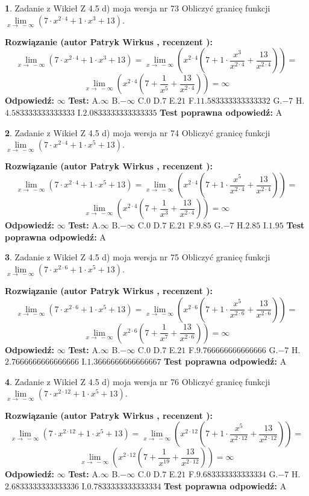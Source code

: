\documentclass[12pt, a4paper]{article}
\theoremstyle{definition} %
\newtheorem{zad}{}
\newcommand{\zadStart}[1]{\begin{zad}#1\newline}
\newcommand{\zadStop}{\end{zad}}
\newcommand{\rozwStart}[2]{\noindent \textbf{Rozwiązanie (autor #1 , recenzent #2): }\newline}
\newcommand{\rozwStop}{\newline}
\newcommand{\odpStart}{\noindent \textbf{Odpowiedź:}\newline}
\newcommand{\odpStop}{\newline}
\newcommand{\testStart}{\noindent \textbf{Test:}\newline}
\newcommand{\testStop}{\newline}
\newcommand{\kluczStart}{\noindent \textbf{Test poprawna odpowiedź:}\newline}
\newcommand{\kluczStop}{\newline}
\begin{document}
\zadStart{Zadanie z Wikieł Z 4.5 d) moja wersja nr 73}
Obliczyć granicę funkcji  $\lim\limits_{x\to\ -\infty}(7 \cdot x^{2\cdot4}+1 \cdot x^{3}+13)$.
\zadStop
\rozwStart{Patryk Wirkus}{}
$$\lim\limits_{x\to\ -\infty}(7 \cdot x^{2\cdot4}+1 \cdot x^{3}+13) = \lim\limits_{x\to\ -\infty}(x^{2\cdot4}(7 +1 \cdot \frac{x^{3}}{x^{2\cdot4}}+\frac{13}{x^{2\cdot4}})) =$$ $$\lim\limits_{x\to\ -\infty}(x^{2\cdot4}(7 +\frac{1}{x^{5}}+\frac{13}{x^{2\cdot4}})) =\infty$$
\rozwStop
\odpStart
$\infty$
\odpStop
\testStart
A.$\infty$ B.$-\infty$ C.$0$ D.$7$ E.$21$
F.$11.583333333333332$ G.$-7$
H.$4.583333333333333$
I.$2.0833333333333335$
\testStop
\kluczStart
A
\kluczStop



\zadStart{Zadanie z Wikieł Z 4.5 d) moja wersja nr 74}
Obliczyć granicę funkcji  $\lim\limits_{x\to\ -\infty}(7 \cdot x^{2\cdot4}+1 \cdot x^{5}+13)$.
\zadStop
\rozwStart{Patryk Wirkus}{}
$$\lim\limits_{x\to\ -\infty}(7 \cdot x^{2\cdot4}+1 \cdot x^{5}+13) = \lim\limits_{x\to\ -\infty}(x^{2\cdot4}(7 +1 \cdot \frac{x^{5}}{x^{2\cdot4}}+\frac{13}{x^{2\cdot4}})) =$$ $$\lim\limits_{x\to\ -\infty}(x^{2\cdot4}(7 +\frac{1}{x^{3}}+\frac{13}{x^{2\cdot4}})) =\infty$$
\rozwStop
\odpStart
$\infty$
\odpStop
\testStart
A.$\infty$ B.$-\infty$ C.$0$ D.$7$ E.$21$
F.$9.85$ G.$-7$
H.$2.85$
I.$1.95$
\testStop
\kluczStart
A
\kluczStop



\zadStart{Zadanie z Wikieł Z 4.5 d) moja wersja nr 75}
Obliczyć granicę funkcji  $\lim\limits_{x\to\ -\infty}(7 \cdot x^{2\cdot6}+1 \cdot x^{5}+13)$.
\zadStop
\rozwStart{Patryk Wirkus}{}
$$\lim\limits_{x\to\ -\infty}(7 \cdot x^{2\cdot6}+1 \cdot x^{5}+13) = \lim\limits_{x\to\ -\infty}(x^{2\cdot6}(7 +1 \cdot \frac{x^{5}}{x^{2\cdot6}}+\frac{13}{x^{2\cdot6}})) =$$ $$\lim\limits_{x\to\ -\infty}(x^{2\cdot6}(7 +\frac{1}{x^{7}}+\frac{13}{x^{2\cdot6}})) =\infty$$
\rozwStop
\odpStart
$\infty$
\odpStop
\testStart
A.$\infty$ B.$-\infty$ C.$0$ D.$7$ E.$21$
F.$9.766666666666666$ G.$-7$
H.$2.7666666666666666$
I.$1.3666666666666667$
\testStop
\kluczStart
A
\kluczStop



\zadStart{Zadanie z Wikieł Z 4.5 d) moja wersja nr 76}
Obliczyć granicę funkcji  $\lim\limits_{x\to\ -\infty}(7 \cdot x^{2\cdot12}+1 \cdot x^{5}+13)$.
\zadStop
\rozwStart{Patryk Wirkus}{}
$$\lim\limits_{x\to\ -\infty}(7 \cdot x^{2\cdot12}+1 \cdot x^{5}+13) = \lim\limits_{x\to\ -\infty}(x^{2\cdot12}(7 +1 \cdot \frac{x^{5}}{x^{2\cdot12}}+\frac{13}{x^{2\cdot12}})) =$$ $$\lim\limits_{x\to\ -\infty}(x^{2\cdot12}(7 +\frac{1}{x^{19}}+\frac{13}{x^{2\cdot12}})) =\infty$$
\rozwStop
\odpStart
$\infty$
\odpStop
\testStart
A.$\infty$ B.$-\infty$ C.$0$ D.$7$ E.$21$
F.$9.683333333333334$ G.$-7$
H.$2.6833333333333336$
I.$0.7833333333333334$
\testStop
\kluczStart
A
\kluczStop
\end{document}
